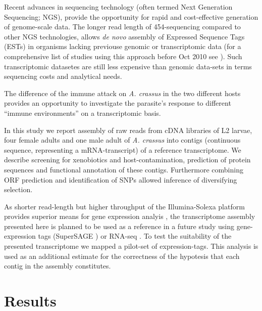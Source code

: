 \documentclass[10pt]{bmc_article}
\newenvironment{bmcformat}{\begin{raggedright}\baselineskip20pt\sloppy\setboolean{publ}{false}}{\end{raggedright}\baselineskip20pt\sloppy}
\begin{document}
\begin{bmcformat}
Recent advances in sequencing technology (often termed Next Generation
Sequencing; NGS), provide the opportunity for rapid and cost-effective
generation of genome-scale data. The longer read length of
454-sequencing \cite{pmid16056220} compared to other NGS technologies,
allows \textit{de novo} assembly of Expressed Sequence Tags (ESTs) in
organisms lacking previouse genomic or transcriptomic data (for a
comprehensive list of studies using this approach before Oct 2010 see
\cite{pmid20950480}). Such transcriptomic datasetes are still less
expensive than genomic data-sets in terms sequencing costs and
analytical needs.

The difference of the immune attack on \textit{A. crassus} in the two
different hosts provides an opportunity to investigate the parasite's
response to different ``immune environments'' on a transcriptomic
basis.

In this study we report assembly of raw reads from cDNA libraries of
L2 larvae, four female adults and one male adult of
\textit{A. crassus} into contigs (continuous sequence, representing a
mRNA-transcript) of a reference transcriptome. We describe screening
for xenobiotics and host-contamination, prediction of protein
sequences and functional annotation of these contigs. Furthermore
combining ORF prediction and identification of SNPs allowed inference
of diversifying selection.


As shorter read-length but higher throughput of the Illumina-Solexa
platform provides superior means for gene expression analyis
\cite{pmid21627854}, the transcriptome assembly presented here is
planned to be used as a reference in a future study using
gene-expression tags (SuperSAGE \cite{pmid20967605}) or RNA-seq
\cite{pmid19015660}. To test the suitability of the presented
transcriptome we mapped a pilot-set of expression-tags. This analysis
is used as an additional estimate for the correctness of the hypotesis
that each contig in the assembly constitutes.

\section*{Results}



\end{bmcformat}
\end{document}
